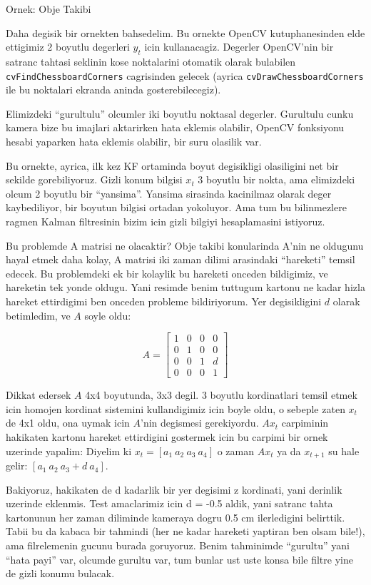 \documentclass[12pt,fleqn]{article}\usepackage{../common}
\begin{document}
Ornek: Obje Takibi

Daha degisik bir ornekten bahsedelim. Bu ornekte OpenCV kutuphanesinden
elde ettigimiz 2 boyutlu degerleri $y_t$ icin kullanacagiz. Degerler
OpenCV'nin bir satranc tahtasi seklinin kose noktalarini otomatik olarak
bulabilen \verb!cvFindChessboardCorners! cagrisinden gelecek (ayrica
\verb!cvDrawChessboardCorners! ile bu noktalari ekranda aninda gosterebilecegiz).

Elimizdeki ``gurultulu'' olcumler iki boyutlu noktasal degerler. Gurultulu
cunku kamera bize bu imajlari aktarirken hata eklemis olabilir, OpenCV
fonksiyonu hesabi yaparken hata eklemis olabilir, bir suru olasilik var.

Bu ornekte, ayrica, ilk kez KF ortaminda boyut degisikligi olasiligini net
bir sekilde gorebiliyoruz. Gizli konum bilgisi $x_t$ 3 boyutlu bir nokta,
ama elimizdeki olcum 2 boyutlu bir ``yansima''. Yansima sirasinda
kacinilmaz olarak deger kaybediliyor, bir boyutun bilgisi ortadan
yokoluyor. Ama tum bu bilinmezlere ragmen Kalman filtresinin bizim icin
gizli bilgiyi hesaplamasini istiyoruz.

Bu problemde A matrisi ne olacaktir? Obje takibi konularinda A'nin ne
oldugunu hayal etmek daha kolay, A matrisi iki zaman dilimi arasindaki
``hareketi'' temsil edecek. Bu problemdeki ek bir kolaylik bu hareketi
onceden bildigimiz, ve hareketin tek yonde oldugu. Yani resimde benim
tuttugum kartonu ne kadar hizla hareket ettirdigimi ben onceden probleme
bildiriyorum. Yer degisikligini $d$ olarak betimledim, ve $A$ soyle oldu:

\[ A = 
\left[\begin{array}{rrrr}
1 & 0 & 0 & 0 \\
0 & 1 & 0 & 0 \\
0 & 0 & 1 & d \\
0 & 0 & 0 & 1
\end{array}\right]
 \]

Dikkat edersek $A$ 4x4 boyutunda, 3x3 degil. 3 boyutlu kordinatlari temsil
etmek icin homojen kordinat sistemini kullandigimiz icin boyle oldu, o
sebeple zaten $x_t$ de 4x1 oldu, ona uymak icin $A$'nin degismesi
gerekiyordu. $Ax_t$ carpiminin hakikaten kartonu hareket ettirdigini
gostermek icin bu carpimi bir ornek uzerinde yapalim: Diyelim 
ki $x_t = [
 a_1 \ a_2 \ a_3 \ a_4 ]$ o zaman $Ax_t$ ya da $x_{t+1}$ su hale gelir: $[
 a_1 \ a_2 \ a_3+d \ a_4 ]$.

Bakiyoruz, hakikaten de d kadarlik bir yer degisimi z kordinati, yani
derinlik uzerinde eklenmis. Test amaclarimiz icin d = -0.5 aldik, yani
satranc tahta kartonunun her zaman diliminde kameraya dogru 0.5 cm
ilerledigini belirttik. Tabii bu da kabaca bir tahmindi (her ne kadar
hareketi yaptiran ben olsam bile!), ama filrelemenin gucunu burada
goruyoruz. Benim tahminimde ``gurultu'' yani ``hata payi'' var, olcumde
gurultu var, tum bunlar ust uste konsa bile filtre yine de gizli konumu
bulacak.
\end{document}
